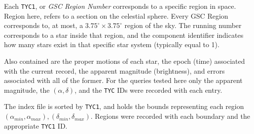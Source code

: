 Each \texttt{TYC1}, or \textit{GSC Region Number} corresponds to a specific region in space.
Region here, refers to a section on the celestial sphere.
Every GSC Region corresponds to, at most, a $3.75^\circ \times 3.75^\circ$ region of the sky.
The running number corresponds to a star inside that region, and the component identifier indicates how many stars
exist in that specific star system (typically equal to 1).

Also contained are the proper motions of each star, the epoch (time) associated with the current record, the apparent
magnitude (brightness), and errors associated with all of the former.
For the queries tested here only the apparent magnitude, the $(\alpha, \delta)$, and the \texttt{TYC} IDs were recorded
with each entry.

The index file is sorted by \texttt{TYC1}, and holds the bounds representing each region $\left(\alpha_{min},
\alpha_{max}\right), \left(\delta_{min}, \delta_{max}\right)$.
Regions were recorded with each boundary and the appropriate \texttt{TYC1} ID\@.

